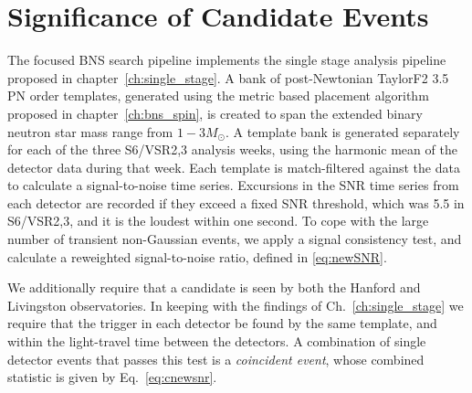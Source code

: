 \section{Significance of Candidate Events}
\label{sec:pipeline}

The focused BNS search pipeline implements the single stage analysis pipeline proposed in chapter~\ref{ch:single_stage}. A bank of post-Newtonian TaylorF2 3.5 PN order templates, generated using the metric based placement algorithm proposed in chapter~\ref{ch:bns_spin}, is created to span the extended binary neutron star mass range from $1-3 M_\odot$. A template bank is generated separately for each of the three S6/VSR2,3 analysis weeks, using the harmonic mean of the detector data during that week. Each template is match-filtered against the data to calculate a signal-to-noise time series. Excursions in the SNR time series from each detector are recorded if they exceed a fixed SNR threshold, which was 5.5 in S6/VSR2,3, and it is the loudest within one second. To cope with the large number of transient non-Gaussian events, we apply a signal consistency test, and calculate a reweighted signal-to-noise ratio, defined in \ref{eq:newSNR}.

We additionally require that a candidate is seen by both the Hanford and Livingston observatories. In keeping with the findings of Ch.~\ref{ch:single_stage} we require that the trigger in each detector be found by the same template, and within the light-travel time between the detectors. A combination of single detector events that passes this test is a \emph{coincident event}, whose combined statistic is given by Eq.~\ref{eq:cnewsnr}.

